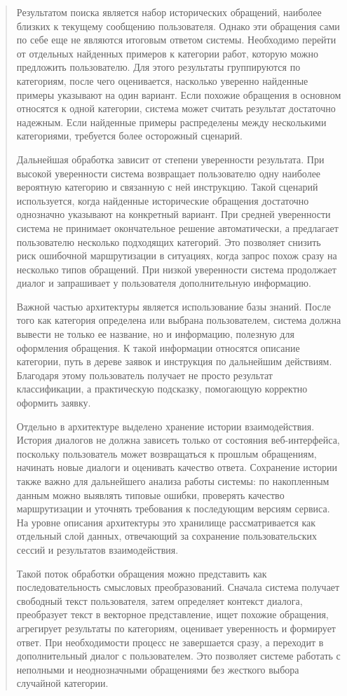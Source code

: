 \documentclass[
]{article}
\begin{document}
\begin{quote}
Результатом поиска является набор исторических обращений, наиболее
близких к текущему сообщению пользователя. Однако эти обращения сами по
себе еще не являются итоговым ответом системы. Необходимо перейти от
отдельных найденных примеров к категории работ, которую можно предложить
пользователю. Для этого результаты группируются по категориям, после
чего оценивается, насколько уверенно найденные примеры указывают на один
вариант. Если похожие обращения в основном относятся к одной категории,
система может считать результат достаточно надежным. Если найденные
примеры распределены между несколькими категориями, требуется более
осторожный сценарий.

Дальнейшая обработка зависит от степени уверенности результата. При
высокой уверенности система возвращает пользователю одну наиболее
вероятную категорию и связанную с ней инструкцию. Такой сценарий
используется, когда найденные исторические обращения достаточно
однозначно указывают на конкретный вариант. При средней уверенности
система не принимает окончательное решение автоматически, а предлагает
пользователю несколько подходящих категорий. Это позволяет снизить риск
ошибочной маршрутизации в ситуациях, когда запрос похож сразу на
несколько типов обращений. При низкой уверенности система продолжает
диалог и запрашивает у пользователя дополнительную информацию.

Важной частью архитектуры является использование базы знаний. После того
как категория определена или выбрана пользователем, система должна
вывести не только ее название, но и информацию, полезную для оформления
обращения. К такой информации относятся описание категории, путь в
дереве заявок и инструкция по дальнейшим действиям. Благодаря этому
пользователь получает не просто результат классификации, а практическую
подсказку, помогающую корректно оформить заявку.

Отдельно в архитектуре выделено хранение истории взаимодействия. История
диалогов не должна зависеть только от состояния веб-интерфейса,
поскольку пользователь может возвращаться к прошлым обращениям, начинать
новые диалоги и оценивать качество ответа. Сохранение истории также
важно для дальнейшего анализа работы системы: по накопленным данным
можно выявлять типовые ошибки, проверять качество маршрутизации и
уточнять требования к последующим версиям сервиса. На уровне описания
архитектуры это хранилище рассматривается как отдельный слой данных,
отвечающий за сохранение пользовательских сессий и результатов
взаимодействия.

Такой поток обработки обращения можно представить как последовательность
смысловых преобразований. Сначала система получает свободный текст
пользователя, затем определяет контекст диалога, преобразует текст в
векторное представление, ищет похожие обращения, агрегирует результаты
по категориям, оценивает уверенность и формирует ответ. При
необходимости процесс не завершается сразу, а переходит в дополнительный
диалог с пользователем. Это позволяет системе работать с неполными и
неоднозначными обращениями без жесткого выбора случайной категории.


\end{quote}
\end{document}
